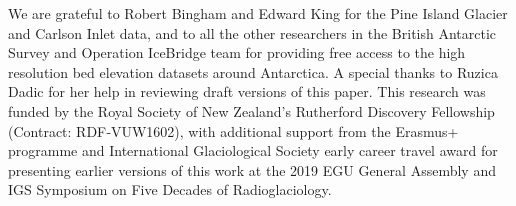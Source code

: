 \documentclass[tc, manuscript]{copernicus}
\begin{document}



\begin{acknowledgements}
  We are grateful to Robert Bingham and Edward King for the Pine Island Glacier and Carlson Inlet data, and to all the other researchers in the British Antarctic Survey and Operation IceBridge team for providing free access to the high resolution bed elevation datasets around Antarctica.
  A special thanks to Ruzica Dadic for her help in reviewing draft versions of this paper.
  This research was funded by the Royal Society of New Zealand's Rutherford Discovery Fellowship (Contract: RDF‐VUW1602), with additional support from the Erasmus+ programme and International Glaciological Society early career travel award for presenting earlier versions of this work at the 2019 EGU General Assembly and IGS Symposium on Five Decades of Radioglaciology.
\end{acknowledgements}














\end{document}
